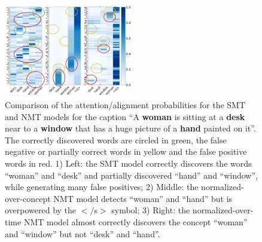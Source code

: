\documentclass[a4paper]{article}
\begin{document}
\begin{figure}[th]
    \centering
    \includegraphics[width=0.5\textwidth]{fig_6_2.png}
    \caption{Comparison of the attention/alignment probabilities for the SMT and NMT models for the caption ``A \textbf{woman} is sitting at a \textbf{desk} near to a \textbf{window} that has a huge picture of a \textbf{hand} painted on it''.  The correctly discovered words are circled in green, the false negative or partially correct words in yellow and the false positive words in red. 1) Left: the SMT model correctly discovers the words ``woman'' and ``desk''  and partially discovered ``hand'' and ``window'', while generating many false positives; 2) Middle: the normalized-over-concept NMT model detects ``woman'' and ``hand'' but is overpowered by the $</$s$>$ symbol; 3) Right: the normalized-over-time NMT model almost correctly discovers the concept ``woman'' and ``window'' but not ``desk'' and ``hand''.}
    \label{fig:attention_compare}
\end{figure}
\end{document}
